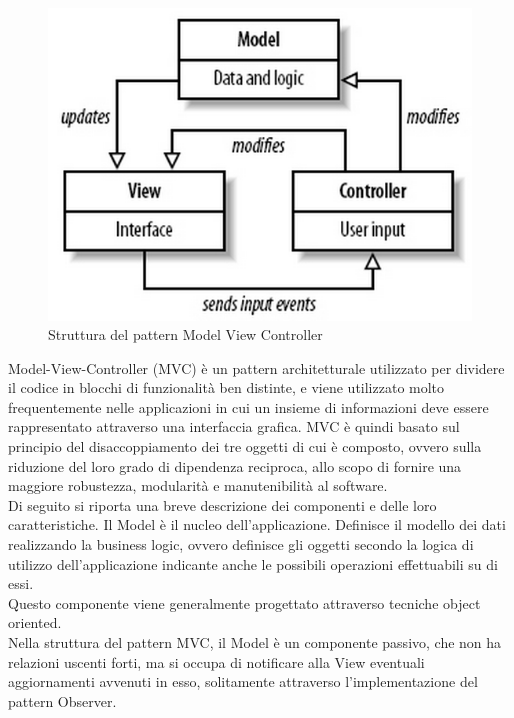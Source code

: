  \label{app:designpattern}
	 \label{app:MVC}
		\begin{figure}[H]\centering
        \includegraphics[scale=0.7]{SpecificaTecnica/Pics/MVC}
        \caption{Struttura del pattern Model View Controller}
		\end{figure}
		Model-View-Controller (MVC) è un pattern architetturale utilizzato per dividere il codice in blocchi di funzionalità ben distinte, e viene utilizzato molto frequentemente nelle applicazioni in cui un insieme di informazioni deve essere rappresentato attraverso una interfaccia grafica.
			MVC è quindi basato sul principio del disaccoppiamento dei tre oggetti di cui è composto, ovvero sulla riduzione del loro grado di dipendenza reciproca, allo scopo di fornire una maggiore robustezza, modularità e manutenibilità al software.\\
			Di seguito si riporta una breve descrizione dei componenti e delle loro caratteristiche. 
				Il Model è il nucleo dell'applicazione. Definisce il modello dei dati realizzando la business logic, ovvero definisce gli oggetti secondo la logica di utilizzo dell'applicazione indicante anche le possibili operazioni effettuabili su di essi.\\
				Questo componente viene generalmente progettato attraverso tecniche object oriented.\\
				Nella struttura del pattern MVC, il Model è un componente passivo, che non ha relazioni uscenti forti, ma si occupa di notificare alla View eventuali aggiornamenti avvenuti in esso, solitamente attraverso l'implementazione del pattern Observer.
